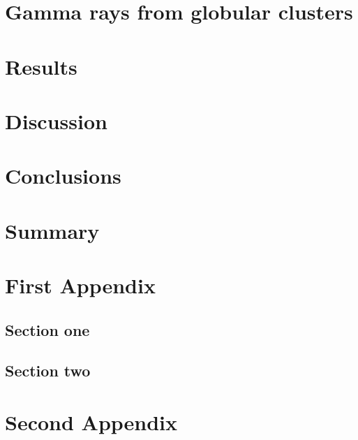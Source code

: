 \documentclass[doublespace,draft,nopageskip]{VTthesis} %
\begin{document}
\chapter{Gamma rays from globular clusters} \label{ch:globular_cluster}



\chapter{Results} \label{ch:results}
\chapter{Discussion} \label{ch:discussion}
\chapter{Conclusions} \label{ch:conclusions}
\chapter{Summary} \label{ch:summary}

% 
%    

\appendix

\begin{appendices}
  \chapter{First Appendix} \label{app:appendix_one}
  \section{Section one} \label{ase:app_one_sect_1}
  \lipsum[1-3]
  \section{Section two} \label{ase:app_one_sect_2}
  \lipsum[1-3]
  \chapter{Second Appendix} \label{app:appendix_two}
  \lipsum[2]
\end{appendices}
\end{document}
